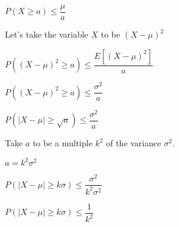 \(P(X\ge a)\le \dfrac{\mu }{a}\)

Let’s take the variable \(X\) to be \((X-\mu )^2\)

\(P((X-\mu )^2\ge a)\le \dfrac{E[(X-\mu )^2]}{a}\)

\(P((X-\mu )^2\ge a)\le \dfrac{\sigma^2}{a}\)

\(P(|X-\mu | \ge \sqrt{a})\le \dfrac{\sigma^2}{a}\)

Take \(a\) to be a multiple \(k^2\) of the variance \(\sigma^2\).

\(a=k^2\sigma^2\)

\(P(|X-\mu | \ge k\sigma )\le \dfrac{\sigma^2}{k^2\sigma^2}\)

\(P(|X-\mu | \ge k\sigma )\le \dfrac{1}{k^2}\)

